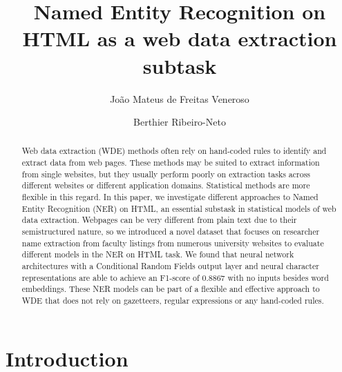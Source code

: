 \documentclass[sigconf]{acmart}
\begin{document}
\title{Named Entity Recognition on HTML as a web data extraction subtask}

\author{João Mateus de Freitas Veneroso}

\author{Berthier Ribeiro-Neto}

\begin{abstract}

Web data extraction (WDE) methods often rely on hand-coded rules to 
identify and extract data from web pages. These methods 
may be suited to extract information from single websites, but
they usually perform poorly on extraction tasks across different 
websites or different application domains. Statistical methods
are more flexible in this regard. In this paper, we investigate
different approaches to Named Entity Recognition (NER) on HTML, an
essential substask in statistical models of web data extraction.
Webpages can be very different from plain text due to their 
semistructured nature, so we introduced a novel dataset that focuses
on researcher name extraction from faculty listings from numerous
university websites to evaluate different models in the 
NER on HTML task. We found that neural network
architectures with a Conditional Random Fields output layer and
neural character representations are able to achieve an F1-score
of 0.8867 with no inputs besides word embeddings. These NER models 
can be part of a flexible and effective approach to WDE that does not
rely on gazetteers, regular expressions or any hand-coded rules. 

\end{abstract}


\maketitle

\section{Introduction}
\end{document}
